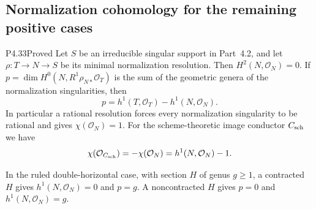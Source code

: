\subsection{Normalization cohomology for the remaining positive cases}

\begin{statement}{P4.33}{Proved}
Let $S$ be an irreducible singular support in Part~4.2, and let
$\rho:T\to N\to S$ be its minimal normalization resolution.
Then $H^2(N,\mathcal O_N)=0$. If
$p=\dim H^0(N,R^1\rho_{N*}\mathcal O_T)$ is the sum of the
geometric genera of the normalization singularities, then
\[
 p=h^1(T,\mathcal O_T)-h^1(N,\mathcal O_N).
\]
In particular a rational resolution forces every normalization
singularity to be rational and gives $\chi(\mathcal O_N)=1$.
For the scheme-theoretic image conductor $C_{\rm sch}$ we have
\[
 \chi(\mathcal O_{C_{\rm sch}})
   =-\chi(\mathcal O_N)=h^1(N,\mathcal O_N)-1.
\]

In the ruled double-horizontal case, with section $H$ of genus
$g\ge1$, a contracted $H$ gives $h^1(N,\mathcal O_N)=0$ and
$p=g$. A noncontracted $H$ gives $p=0$ and
$h^1(N,\mathcal O_N)=g$.
\end{statement}
